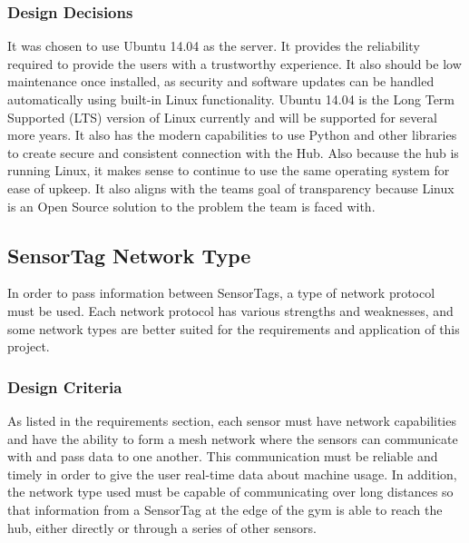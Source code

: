 \documentclass[PPFS.tex]{template/subfiles}
\begin{document}
\subsubsection{Design Decisions}
It was chosen to use Ubuntu 14.04 as the server. It provides the reliability required to provide the users with a trustworthy experience. It also should be low maintenance once installed, as security and software updates can be handled automatically using built-in Linux functionality. Ubuntu 14.04 is the Long Term Supported (LTS) version of Linux currently and will be supported for
several more years. It also has the modern capabilities to use Python and other libraries to create secure and consistent connection with the Hub. Also because the hub is running Linux, it makes sense to continue to use the same operating system for ease of upkeep. It also aligns with the teams goal of transparency because Linux is an Open Source solution to the problem the team is faced with.

\subsection{SensorTag Network Type}
In order to pass information between SensorTags, a type of network protocol must be used. Each network protocol has various strengths and weaknesses, and some network types are better suited for the requirements and application of this project.

\subsubsection{Design Criteria}
As listed in the requirements section, each sensor must have network capabilities and have the ability to form a mesh network where the sensors can communicate with and pass data to one another. This communication must be reliable and timely in order to give the user real-time data about machine usage. In addition, the network type used must be capable of communicating over long distances so that information from a SensorTag at the edge of the gym is able to reach the hub, either directly or through a series of other sensors.
\end{document}
